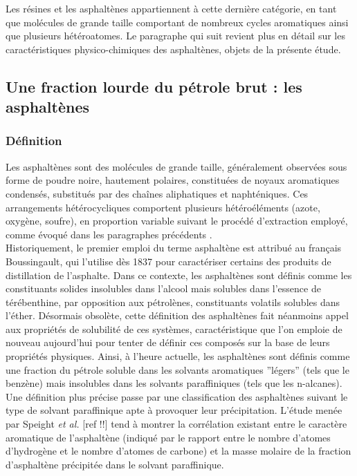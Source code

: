 Les résines et les asphaltènes appartiennent à cette dernière catégorie, en tant que molécules de grande taille comportant de nombreux cycles aromatiques ainsi que plusieurs hétéroatomes. Le paragraphe qui suit revient plus en détail sur les caractéristiques physico-chimiques des asphaltènes, objets de la présente étude. 

\subsection{Une fraction lourde du pétrole brut : les asphaltènes}


\subsubsection{Définition}

Les asphaltènes sont des molécules de grande taille, généralement observées sous forme de poudre noire, hautement polaires, constituées de noyaux aromatiques condensés, substitués par des chaînes aliphatiques et naphténiques. Ces arrangements hétérocycliques comportent plusieurs hétéroéléments (azote, oxygène, soufre), en proportion variable suivant le procédé d'extraction employé, comme évoqué dans les paragraphes précédents \cite{calles2007properties}.\\

Historiquement, le premier emploi du terme \og asphaltène \fg{} est attribué au français Boussingault, qui l'utilise dès 1837 pour caractériser certains des produits de distillation de l'asphalte\cite{goual2012petroleum}. Dans ce contexte, les \og asphaltènes \fg{} sont définis comme les constituants solides insolubles dans l'alcool mais solubles dans l'essence de térébenthine, par opposition aux \og pétrolènes\fg, constituants volatils solubles dans l'éther.
Désormais obsolète, cette définition des asphaltènes fait néanmoins appel aux propriétés de solubilité de ces systèmes, caractéristique que l'on emploie de nouveau aujourd'hui pour tenter de définir ces composés sur la base de leurs propriétés physiques. Ainsi, à l'heure actuelle, les asphaltènes sont définis comme une fraction du pétrole soluble dans les solvants aromatiques ''légers'' (tels que le benzène) mais insolubles dans les solvants paraffiniques (tels que les n-alcanes). Une définition plus précise passe par une classification des asphaltènes suivant le type de solvant paraffinique apte à provoquer leur précipitation. L'étude menée par Speight \textit{et al.} [ref !!] tend à montrer la corrélation existant entre le caractère aromatique de l'asphaltène (indiqué par le rapport entre le nombre d'atomes d'hydrogène et le nombre d'atomes de carbone) et la masse molaire de la fraction d'asphaltène précipitée dans le solvant paraffinique.\\  


